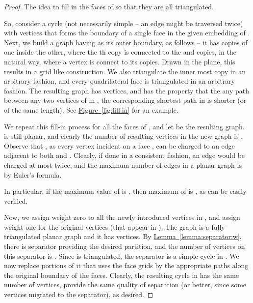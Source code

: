 \documentclass[12pt]{article}
\theoremstyle{remark}\theoremheaderfont{\sf}\theorembodyfont{\upshape}\newtheorem{defn}[theorem]{Definition}
\newcommand{\HLink}[2]{\hyperref[#2]{#1~\ref*{#2}}}
\newcommand{\lemref}[1]{\HLink{Lemma}{lemma:#1}}
\newcommand{\figlab}[1]{\label{fig:#1}}
\newcommand{\figref}[1]{\HLink{Figure}{fig:#1}}
\renewcommand{\th}{th\xspace}
\begin{document}
\begin{proof}
    The idea to fill in the faces of  so that they are all
    triangulated.

    So, consider a cycle  (not necessarily simple -- an edge might
    be traversed twice) with  vertices that forms the boundary of a
    single face in the given embedding of . Next, we build a
    graph having  as its outer boundary, as follows -- it has
     copies of  one inside the other, where the \th copy
     is connected to the  and  copies, in the natural
    way, where a vertex is connect to its copies. Drawn in the plane,
    this results in a grid like construction.  We also triangulate the
    inner most copy  in an arbitrary fashion, and every
    quadrilateral face is triangulated in an arbitrary fashion. The
    resulting graph  has  vertices, and has the
    property that the any path between any two vertices of  in
    , the corresponding shortest path in  is shorter (or
    of the same length). See \figref{fill:in} for an example.

    \parpic[r]{\begin{minipage}{5cm}
           \texttt{[image: figs/grid\_face]}
           \captionof{figure}{}
           \figlab{fill:in}
       \end{minipage}}

    We repeat this fill-in process for all the faces of , and
    let  be the resulting graph.  is still planar,
    and clearly the number of resulting vertices in the new graph is
    . Observe that , as every
    vertex  incident on a face , can be charged to an edge
    adjacent to both  and . Clearly, if done in a consistent
    fashion, an edge would be charged at most twice, and the maximum
    number of edges in a planar graph is  by Euler's formula.

    In particular, if the maximum value of  is , then maximum
    of  is , as can be easily verified.

    Now, we assign weight zero to all the newly introduced vertices in
    , and assign weight one for the original vertices (that
    appear in ). The graph  is a fully triangulated
    planar graph and it has  vertices.  By \lemref{separator:w},
    there is separator providing the desired partition, and the number
    of vertices on this separator is . Since
     is triangulated, the separator is a simple cycle in
    . We now replace portions of it that uses the face grids
    by the appropriate paths along the original boundary of the
    faces. Clearly, the resulting cycle in  has the same
    number of vertices, provide the same quality of separation (or
    better, since some vertices migrated to the separator), as
    desired.
\end{proof}
\end{document}
